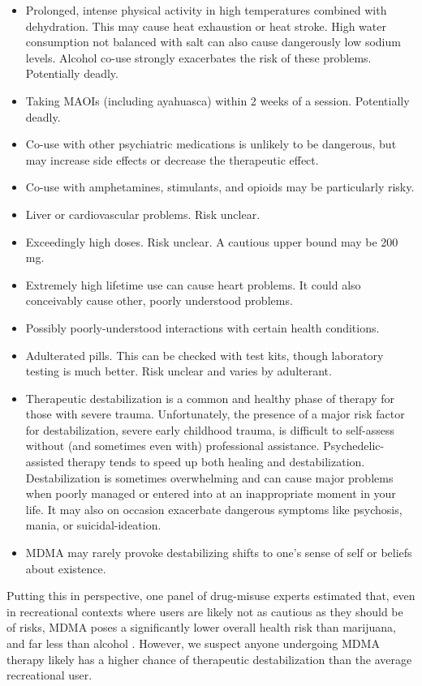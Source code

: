 \documentclass[12pt,letterpaper]{book}
\begin{document}
\begin{itemize}
    \item Prolonged, intense physical activity in high temperatures combined with dehydration. This may cause heat exhaustion or heat stroke. High water consumption not balanced with salt can also cause dangerously low sodium levels. Alcohol co-use strongly exacerbates the risk of these problems. Potentially deadly.
    \item Taking MAOIs (including ayahuasca) within 2 weeks of a session. Potentially deadly.
    \item Co-use with other psychiatric medications is unlikely to be dangerous, but may increase side effects or decrease the therapeutic effect.
    \item Co-use with amphetamines, stimulants, and opioids may be particularly risky.
    \item Liver or cardiovascular problems. Risk unclear.
    \item Exceedingly high doses. Risk unclear. A cautious upper bound may be 200 mg.
    \item Extremely high lifetime use can cause heart problems. It could also conceivably cause other, poorly understood problems.
    \item Possibly poorly-understood interactions with certain health conditions.
    \item Adulterated pills. This can be checked with test kits, though laboratory testing is much better. Risk unclear and varies by adulterant.
    \item Therapeutic destabilization is a common and healthy phase of therapy for those with severe trauma. Unfortunately, the presence of a major risk factor for destabilization, severe early childhood trauma, is difficult to self-assess without (and sometimes even with) professional assistance. Psychedelic-assisted therapy tends to speed up both healing and destabilization. Destabilization is sometimes overwhelming and can cause major problems when poorly managed or entered into at an inappropriate moment in your life. It may also on occasion exacerbate dangerous symptoms like psychosis, mania, or suicidal-ideation.
    \item MDMA may rarely provoke destabilizing shifts to one's sense of self or beliefs about existence.
\end{itemize}
Putting this in perspective, one panel of drug-misuse experts estimated that, even in recreational contexts where users are likely not as cautious as they should be of risks, MDMA poses a significantly lower overall health risk than marijuana, and far less than alcohol \cite{nuttDrugHarms}. However, we suspect anyone undergoing MDMA therapy likely has a higher chance of therapeutic destabilization than the average recreational user.
\end{document}
